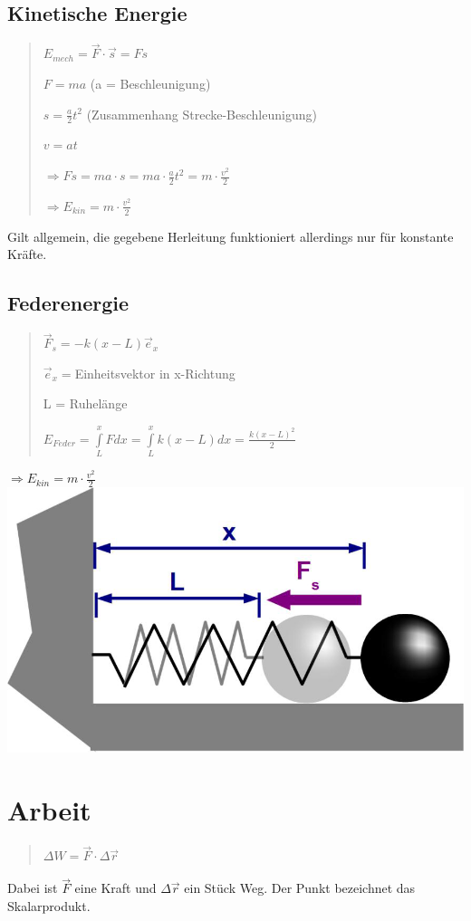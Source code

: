 \subsection*{Kinetische Energie}
\begin{verse}
$E_{mech}=\vec{F}\cdot\vec{s}=Fs$

$F=ma$ (a = Beschleunigung)

$s=\frac{a}{2}t^{2}$ (Zusammenhang Strecke-Beschleunigung)

$v=at$

$\Rightarrow Fs=ma\cdot s=ma\cdot\frac{a}{2}t^{2}=m\cdot\frac{v^{2}}{2}$

$\Rightarrow E_{kin}=m\cdot\frac{v^{2}}{2}$
\end{verse}
Gilt allgemein, die gegebene Herleitung funktioniert allerdings nur
für konstante Kräfte.


\subsection*{Federenergie}
\begin{verse}
$\vec{F}_{s}=-k(x-L)\vec{e}_{x}$

$\vec{e}_{x}=$Einheitsvektor in x-Richtung

L = Ruhelänge

$E_{Feder}=\overset{x}{\underset{L}{\int}}Fdx=\overset{x}{\underset{L}{\int}}k(x-L)dx=\frac{k(x-L)^{2}}{2}$
\end{verse}
$\Rightarrow E_{kin}=m\cdot\frac{v^{2}}{2}$\includegraphics[scale=0.3]{Energie-Leistung-Potentiale/Federenergie}


\section*{Arbeit}
\begin{verse}
$\Delta W=\vec{F}\cdot\Delta\vec{r}$
\end{verse}
Dabei ist $\vec{F}$ eine Kraft und $\Delta\vec{r}$ ein Stück Weg.
Der Punkt bezeichnet das Skalarprodukt.


